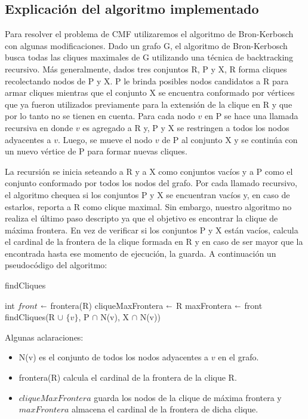 \subsection{Explicación del algoritmo implementado}

Para resolver el problema de CMF utilizaremos el algoritmo de Bron-Kerbosch con algunas modificaciones. Dado un grafo G, el algoritmo de Bron-Kerbosch busca todas las cliques maximales de G utilizando una técnica de backtracking recursivo. Más generalmente, dados tres conjuntos R, P y X, R forma cliques recolectando nodos de P y X. P le brinda posibles nodos candidatos a R para armar cliques mientras que el conjunto X se encuentra conformado por vértices que ya fueron utilizados previamente para la extensión de la clique en R y que por lo tanto no se tienen en cuenta. Para cada nodo $v$ en P se hace una llamada recursiva en donde $v$ es agregado a R y, P y X se restringen a todos los nodos adyacentes a $v$. Luego, se mueve el nodo $v$ de P al conjunto X y se continúa con un nuevo vértice de P para formar nuevas cliques.

La recursión se inicia seteando a R y a X como conjuntos vacíos y a P como el conjunto conformado por todos los nodos del grafo. Por cada llamado recursivo, el algoritmo chequea si los conjuntos P y X se encuentran vacíos y, en caso de estarlos, reporta a R como clique maximal. Sin embargo, nuestro algoritmo no realiza el último paso descripto ya que el objetivo es encontrar la clique de máxima frontera. En vez de verificar si los conjuntos P y X están vacíos, calcula el cardinal de la frontera de la clique formada en R y en caso de ser mayor que la encontrada hasta ese momento de ejecución, la guarda. A continuación un pseudocódigo del algoritmo:

\begin{algorithm}[H]
\caption{findCliques}\label{ej1}
\begin{algorithmic}[1]
	\State int $front$ $\shortleftarrow$ frontera(R)
		\State cliqueMaxFrontera $\shortleftarrow$ R
		\State maxFrontera $\shortleftarrow$ front
	\EndIf
		\State findCliques(R $\cup$ $\{v\}$, P $\cap$ N(v), X $\cap$ N(v))
	\EndFor
\EndProcedure
\end{algorithmic}
\end{algorithm}

Algunas aclaraciones:
\begin{itemize}
	\item N(v) es el conjunto de todos los nodos adyacentes a $v$ en el grafo.
	\item frontera(R) calcula el cardinal de la frontera de la clique R.
	\item $cliqueMaxFrontera$ guarda los nodos de la clique de máxima frontera y $maxFrontera$ almacena el cardinal de la frontera de dicha clique.
\end{itemize}

